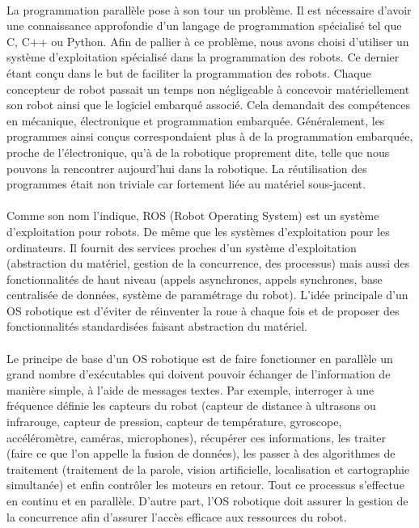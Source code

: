 \documentclass[12pt,a4paper]{article}
\begin{document}
\paragraph{}
La programmation parallèle pose à son tour un problème. Il est nécessaire d'avoir
une connaissance approfondie d'un langage de programmation spécialisé tel que C, C++ ou Python. Afin de pallier à ce problème, nous avons 
choisi d'utiliser un système d'exploitation spécialisé dans la programmation des robots. Ce dernier étant conçu dans 
le but de faciliter la programmation des robots. Chaque concepteur de robot passait un temps non négligeable 
à concevoir matériellement son robot ainsi que le logiciel 
embarqué associé. Cela demandait des compétences en mécanique, électronique et programmation embarquée. 
Généralement, les programmes ainsi conçus correspondaient plus à de la programmation embarquée, proche 
de l'électronique, qu'à de la robotique proprement dite, telle que nous pouvons la rencontrer aujourd'hui 
dans la robotique. La réutilisation des programmes était non triviale car fortement liée au 
matériel sous-jacent. 

\paragraph{}
Comme son nom l'indique, ROS (Robot Operating System) est un système d'exploitation pour robots. De même que 
les systèmes d'exploitation pour les ordinateurs. 
Il fournit des services proches d'un système d'exploitation (abstraction du matériel, 
gestion de la concurrence, des processus) mais aussi des fonctionnalités de haut niveau (appels 
asynchrones, appels synchrones, base centralisée de données, système de paramétrage du robot). L'idée principale d'un OS 
robotique est d'éviter de réinventer la roue à chaque fois et de proposer des fonctionnalités standardisées faisant 
abstraction du matériel.

\paragraph{}
Le principe de base d'un OS robotique est de faire fonctionner en parallèle un grand nombre d'exécutables qui 
doivent pouvoir échanger de l'information de manière simple, à l'aide de messages textes. Par exemple,
interroger à une fréquence définie les capteurs du robot (capteur de distance à ultrasons ou infrarouge, capteur 
de pression, capteur de température, gyroscope, accéléromètre, caméras, microphones), récupérer ces informations, 
les traiter (faire ce que l'on appelle la fusion de données), les passer à des algorithmes de traitement (traitement 
de la parole, vision artificielle, localisation et cartographie simultanée) et enfin contrôler les moteurs en retour. 
Tout ce processus s'effectue en continu et en parallèle. D'autre part, l'OS robotique doit assurer la gestion de la 
concurrence afin d'assurer l'accès efficace aux ressources du robot. 
\end{document}
